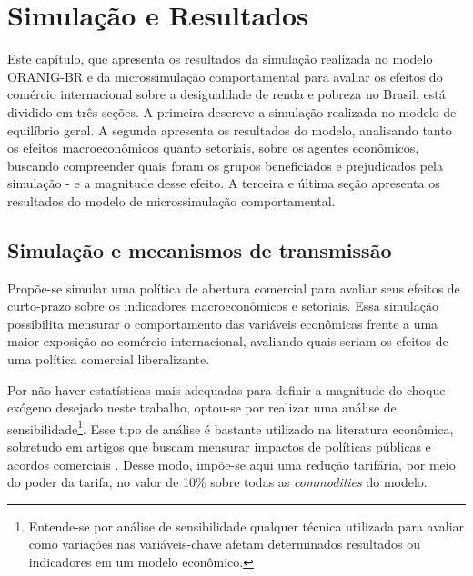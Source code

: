 

\chapter{Simulação e Resultados} \label{cha:resultados}

Este capítulo, que apresenta os resultados da simulação realizada no modelo ORANIG-BR e da microssimulação comportamental para avaliar os efeitos do comércio internacional sobre a desigualdade de renda e pobreza no Brasil, está dividido em três seções. A primeira descreve a simulação realizada no modelo de equilíbrio geral. A segunda apresenta os resultados do modelo, analisando tanto os efeitos macroeconômicos quanto setoriais, sobre os agentes econômicos, buscando compreender quais foram os grupos beneficiados e prejudicados pela simulação - e a magnitude desse efeito. A terceira e última seção apresenta os resultados do modelo de microssimulação comportamental.



\section{Simulação e mecanismos de transmissão} \label{sec:simulacao}

Propõe-se simular uma política de abertura comercial para avaliar seus efeitos de curto-prazo sobre os indicadores macroeconômicos e setoriais. Essa simulação possibilita mensurar o comportamento das variáveis econômicas frente a uma maior exposição ao comércio internacional, avaliando quais seriam os efeitos de uma política comercial liberalizante.

Por não haver estatísticas mais adequadas para definir a magnitude do choque exógeno desejado neste trabalho, optou-se por realizar uma análise de sensibilidade\footnote{Entende-se por análise de sensibilidade qualquer técnica utilizada para avaliar como variações nas variáveis-chave afetam determinados resultados ou indicadores em um modelo econômico.}. Esse tipo de análise é bastante utilizado na literatura econômica, sobretudo em artigos que buscam mensurar impactos de políticas públicas e acordos comerciais \cite{haddad05, domingues08,perobelli17}. Desse modo, impõe-se aqui uma redução tarifária, por meio do poder da tarifa, no valor de 10\% sobre todas as \textit{commodities} do modelo.

